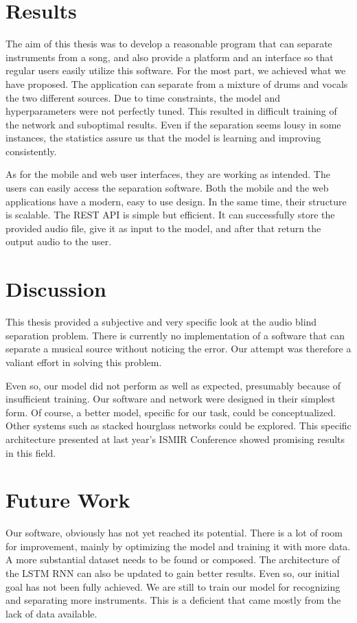 \documentclass[../Thesis.tex]{subfiles}
\begin{document}
\section {Results}

The aim of this thesis was to develop a reasonable program that can separate instruments from a song, and also provide a platform and an interface so that regular users easily utilize this software. For the most part, we achieved what we have proposed. The application can separate from a mixture of drums and vocals the two different sources. Due to time constraints, the model and hyperparameters were not perfectly tuned. This resulted in difficult training of the network and suboptimal results. Even if the separation seems lousy in some instances, the statistics assure us that the model is learning and improving consistently. 

As for the mobile and web user interfaces, they are working as intended. The users can easily access the separation software. Both the mobile and the web applications have a modern, easy to use design. In the same time, their structure is scalable.
The REST API is simple but efficient. It can successfully store the provided audio file, give it as input to the model, and after that return the output audio to the user. 


\section {Discussion}

This thesis provided a subjective and very specific look at the audio blind separation problem. There is currently no implementation of a software that can separate a musical source without noticing the error. Our attempt was therefore a valiant effort in solving this problem.

Even so, our model did not perform as well as expected, presumably because of insufficient training. Our software and network were designed in their simplest form. Of course, a better model, specific for our task, could be conceptualized. Other systems such as stacked hourglass networks could be explored. This specific architecture presented at last year’s ISMIR Conference showed promising results in this field.

\section {Future Work}

Our software, obviously has not yet reached its potential. There is a lot of room for improvement, mainly by optimizing the model and training it with more data. A more substantial dataset needs to be found or composed. The architecture of the LSTM RNN can also be updated to gain better results. Even so, our initial goal has not been fully achieved. We are still to train our model for recognizing and separating more instruments. This is a deficient that came mostly from the lack of data available.
\end{document}
